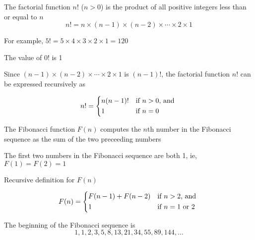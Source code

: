 \documentclass[8pt,a4paper,compress]{beamer}
\begin{document}
\begin{frame}[fragile]
\pause

The factorial function $n!$ ($n > 0$) is the product of all positive integers less than or equal to $n$ $$n! = n \times (n - 1) \times (n - 2) \times \cdots \times 2 \times 1$$

\pause\bigskip

For example, $5! = 5 \times 4 \times 3 \times 2 \times 1 = 120$

\pause\bigskip

The value of $0!$ is 1

\pause\bigskip

Since $(n - 1) \times (n - 2) \times \cdots \times 2 \times 1$ is $(n - 1)!$, the factorial function $n!$ can be expressed recursively as

\[
n! = \begin{dcases*}
n(n-1)! & if $n > 0$, and \\
1       & if $n = 0$
\end{dcases*}
\]
\end{frame}

\begin{frame}[fragile]
\pause

The Fibonacci function $F(n)$ computes the $n$th number in the Fibonacci sequence as the sum of the two preceeding numbers

\pause\bigskip

The first two numbers in the Fibonacci sequence are both 1, ie, $F(1) = F(2) = 1$

\pause\bigskip

Recursive definition for $F(n)$

\[
F(n) = \begin{dcases*}
F(n - 1) + F(n - 2) & if $n > 2$, and \\
1       & if $n = 1$ or $2$
\end{dcases*}
\]

\pause\bigskip

The beginning of the Fibonacci sequence is
$$1, 1, 2, 3, 5, 8, 13, 21, 34, 55, 89, 144, \dots$$
\end{frame}
\end{document}
